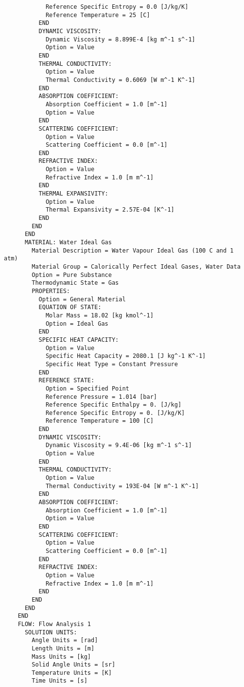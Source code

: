 \begin{verbatim}
            Reference Specific Entropy = 0.0 [J/kg/K]
            Reference Temperature = 25 [C]
          END
          DYNAMIC VISCOSITY:
            Dynamic Viscosity = 8.899E-4 [kg m^-1 s^-1]
            Option = Value
          END
          THERMAL CONDUCTIVITY:
            Option = Value
            Thermal Conductivity = 0.6069 [W m^-1 K^-1]
          END
          ABSORPTION COEFFICIENT:
            Absorption Coefficient = 1.0 [m^-1]
            Option = Value
          END
          SCATTERING COEFFICIENT:
            Option = Value
            Scattering Coefficient = 0.0 [m^-1]
          END
          REFRACTIVE INDEX:
            Option = Value
            Refractive Index = 1.0 [m m^-1]
          END
          THERMAL EXPANSIVITY:
            Option = Value
            Thermal Expansivity = 2.57E-04 [K^-1]
          END
        END
      END
      MATERIAL: Water Ideal Gas
        Material Description = Water Vapour Ideal Gas (100 C and 1 atm)
        Material Group = Calorically Perfect Ideal Gases, Water Data
        Option = Pure Substance
        Thermodynamic State = Gas
        PROPERTIES:
          Option = General Material
          EQUATION OF STATE:
            Molar Mass = 18.02 [kg kmol^-1]
            Option = Ideal Gas
          END
          SPECIFIC HEAT CAPACITY:
            Option = Value
            Specific Heat Capacity = 2080.1 [J kg^-1 K^-1]
            Specific Heat Type = Constant Pressure
          END
          REFERENCE STATE:
            Option = Specified Point
            Reference Pressure = 1.014 [bar]
            Reference Specific Enthalpy = 0. [J/kg]
            Reference Specific Entropy = 0. [J/kg/K]
            Reference Temperature = 100 [C]
          END
          DYNAMIC VISCOSITY:
            Dynamic Viscosity = 9.4E-06 [kg m^-1 s^-1]
            Option = Value
          END
          THERMAL CONDUCTIVITY:
            Option = Value
            Thermal Conductivity = 193E-04 [W m^-1 K^-1]
          END
          ABSORPTION COEFFICIENT:
            Absorption Coefficient = 1.0 [m^-1]
            Option = Value
          END
          SCATTERING COEFFICIENT:
            Option = Value
            Scattering Coefficient = 0.0 [m^-1]
          END
          REFRACTIVE INDEX:
            Option = Value
            Refractive Index = 1.0 [m m^-1]
          END
        END
      END
    END
    FLOW: Flow Analysis 1
      SOLUTION UNITS:
        Angle Units = [rad]
        Length Units = [m]
        Mass Units = [kg]
        Solid Angle Units = [sr]
        Temperature Units = [K]
        Time Units = [s]

\end{verbatim}
